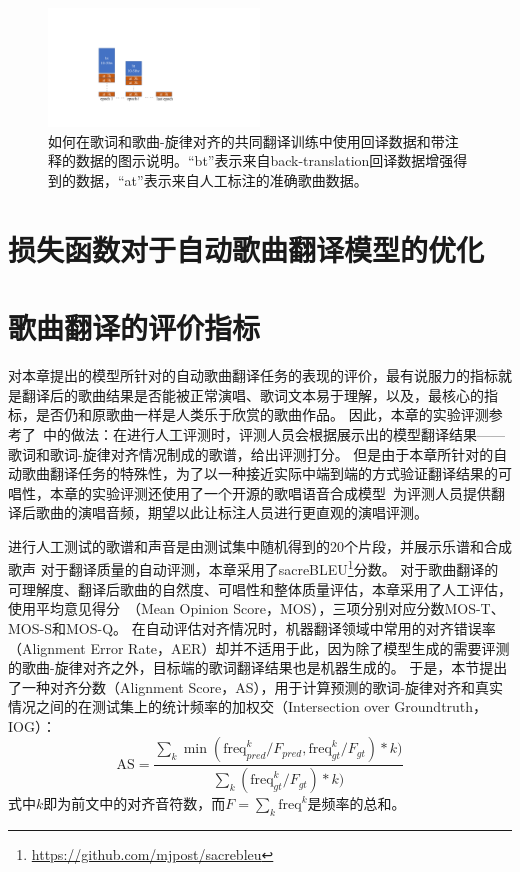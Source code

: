 \begin{figure}[htbp]
    \centering
    \includegraphics[width=0.5\textwidth]{figure/ast/backtrans_curriculum.pdf}
    \caption{如何在歌词和歌曲-旋律对齐的共同翻译训练中使用回译数据和带注释的数据的图示说明。``bt''表示来自back-translation回译数据增强得到的数据，``at''表示来自人工标注的准确歌曲数据。}
    \label{fig:bt_curriculum}
\end{figure}
\section{损失函数对于自动歌曲翻译模型的优化}
\section{歌曲翻译的评价指标}
\label{sec:metric}
对本章提出的模型所针对的自动歌曲翻译任务的表现的评价，最有说服力的指标就是翻译后的歌曲结果是否能被正常演唱、歌词文本易于理解，以及，最核心的指标，是否仍和原歌曲一样是人类乐于欣赏的歌曲作品。
因此，本章的实验评测参考了\citet{songmass}~中的做法：在进行人工评测时，评测人员会根据展示出的模型翻译结果——歌词和歌词-旋律对齐情况制成的歌谱，给出评测打分。
但是由于本章所针对的自动歌曲翻译任务的特殊性，为了以一种接近实际中端到端的方式验证翻译结果的可唱性，本章的实验评测还使用了一个开源的歌唱语音合成模型~\citep{diffsinger}为评测人员提供翻译后歌曲的演唱音频，期望以此让标注人员进行更直观的演唱评测。

进行人工测试的歌谱和声音是由测试集中随机得到的20个片段，并展示乐谱和合成歌声
对于翻译质量的自动评测，本章采用了sacreBLEU\footnote{\url{https://github.com/mjpost/sacrebleu}}分数。
对于歌曲翻译的可理解度、翻译后歌曲的自然度、可唱性和整体质量评估，本章采用了人工评估，使用平均意见得分~（Mean Opinion Score，MOS），三项分别对应分数MOS-T、MOS-S和MOS-Q。
在自动评估对齐情况时，机器翻译领域中常用的对齐错误率（Alignment Error Rate，AER）却并不适用于此，因为除了模型生成的需要评测的歌曲-旋律对齐之外，目标端的歌词翻译结果也是机器生成的。
于是，本节提出了一种对齐分数（Alignment Score，AS），用于计算预测的歌词-旋律对齐和真实情况之间的在测试集上的统计频率的加权交（Intersection over Groundtruth，IOG）：
\begin{equation}
    \text{AS} = \frac{\sum_{k}\min(\text{freq}_{pred}^k/F_{pred}, \text{freq}_{gt}^k/F_{gt}) * k)}{\sum_{k} (\text{freq}_{gt}^k/F_{gt}) * k) }
\end{equation}
式中$k$即为前文中的对齐音符数，而$F = \sum_{k} \text{freq}^k$是频率的总和。
